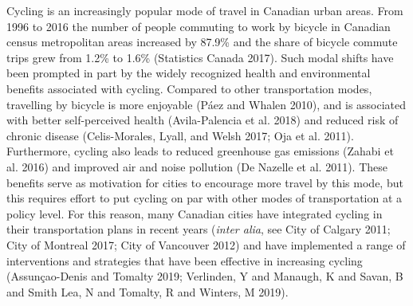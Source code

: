 \documentclass[smallextended]{svjour3}       %
\begin{document}
Cycling is an increasingly popular mode of travel in Canadian urban
areas. From 1996 to 2016 the number of people commuting to work by
bicycle in Canadian census metropolitan areas increased by 87.9\% and
the share of bicycle commute trips grew from 1.2\% to 1.6\% (Statistics
Canada 2017). Such modal shifts have been prompted in part by the widely
recognized health and environmental benefits associated with cycling.
Compared to other transportation modes, travelling by bicycle is more
enjoyable (Páez and Whalen 2010), and is associated with better
self-perceived health (Avila-Palencia et al. 2018) and reduced risk of
chronic disease (Celis-Morales, Lyall, and Welsh 2017; Oja et al. 2011).
Furthermore, cycling also leads to reduced greenhouse gas emissions
(Zahabi et al. 2016) and improved air and noise pollution (De Nazelle et
al. 2011). These benefits serve as motivation for cities to encourage
more travel by this mode, but this requires effort to put cycling on par
with other modes of transportation at a policy level. For this reason,
many Canadian cities have integrated cycling in their transportation
plans in recent years (\emph{inter alia}, see City of Calgary 2011; City
of Montreal 2017; City of Vancouver 2012) and have implemented a range
of interventions and strategies that have been effective in increasing
cycling (Assunçao-Denis and Tomalty 2019; Verlinden, Y and Manaugh, K
and Savan, B and Smith Lea, N and Tomalty, R and Winters, M 2019).
\end{document}
